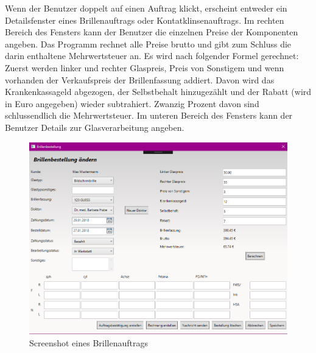 Wenn der Benutzer doppelt auf einen Auftrag klickt, erscheint entweder ein Detailsfenster eines Brillenauftrags oder Kontatklinsenauftrags. Im rechten Bereich des Fensters kann der Benutzer die einzelnen Preise der Komponenten angeben. Das Programm rechnet alle Preise  brutto und gibt zum Schluss die darin enthaltene Mehrwertsteuer an. Es wird nach folgender Formel gerechnet: Zuerst werden linker und rechter Glaspreis, Preis von Sonstigem und wenn vorhanden der Verkaufspreis der Brillenfassung addiert. Davon wird das Krankenkassageld abgezogen, der Selbstbehalt hinzugezählt und der Rabatt (wird in Euro angegeben) wieder subtrahiert. Zwanzig Prozent davon sind schlussendlich die Mehrwertsteuer. 
Im unteren Bereich des Fensters kann der Benutzer Details zur Glasverarbeitung angeben. 
\begin{figure}[H]
\begin{center}
	\includegraphics[scale=.25]{images/Brillenauftrag.png}
\end{center}
	\caption{Screenshot eines Brillenauftrags}
	\label{fig:sample}
\end{figure}
